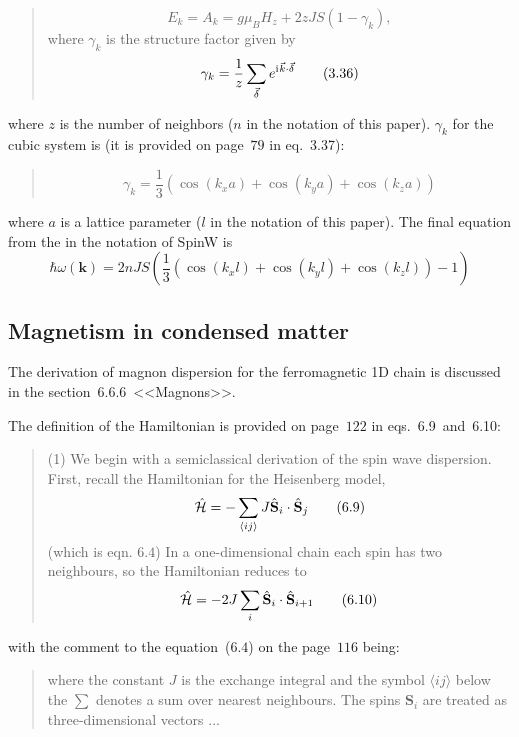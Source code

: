     \begin{quote}
        \begin{equation}
            E_k = A_k = g\mu_B H_z + 2zJS(1 - \gamma_k), \label{eq:fom-3.35} \tag{3.35}
        \end{equation}
        where $\gamma_k$ is the structure factor given by
        \begin{equation}
            \gamma_k = \dfrac{1}{z}\sum_{\vec{\delta}}e^{\mathrm{i}\mkern1mu \vec{k}\cdot\vec{\delta}} \label{eq:fom-3.36} \tag{3.36}
        \end{equation}
    \end{quote}
    where $z$ is the number of neighbors ($n$ in the notation of this paper). $\gamma_k$ for the cubic system is (it is provided on page~$79$ in eq.~3.37):
    \begin{quote}
        \begin{equation}
            \gamma_k = \dfrac{1}{3}(\cos(k_xa) + \cos(k_ya) + \cos(k_za)) \label{eq:fom-3.37} \tag{3.37}
        \end{equation}
    \end{quote}
    where $a$ is a lattice parameter ($l$ in the notation of this paper). The final equation from the \cite{rezende2020fundamentals} in the notation of SpinW is
    \begin{equation}
        \hbar\omega(\mathbf{k}) = 2nJS\left(\dfrac{1}{3}\left(\cos(k_xl) + \cos(k_yl) + \cos(k_zl)\right) - 1\right)
        \label{eq:rezende}
    \end{equation}

\subsection{Magnetism in condensed matter \cite{blundell2003magnetism}}
    The derivation of magnon dispersion for the ferromagnetic 1D chain is discussed in the section~$6.6.6$~<<Magnons>>.

    The definition of the Hamiltonian is provided on page~$122$ in eqs.~6.9~and~6.10:
    \begin{quote}
        (1) We begin with a semiclassical derivation of the spin wave dispersion.
        First, recall the Hamiltonian for the Heisenberg model,
        \begin{equation}
            \hat{\mathcal{H}} = -\sum_{\langle ij\rangle} J\hat{\mathbf{S}}_i \cdot \hat{\mathbf{S}}_j \label{eq:micm-6.9} \tag{6.9}
        \end{equation}
        (which is eqn. $6.4$) In a one-dimensional chain each spin has two neighbours, so the Hamiltonian reduces to
        \begin{equation}
            \hat{\mathcal{H}} = -2J\sum_{i} \hat{\mathbf{S}}_i \cdot \hat{\mathbf{S}}_{i+1} \label{eq:micm-6.10} \tag{6.10}
        \end{equation}
    \end{quote}
    with the comment to the equation~($6.4$) on the page~$116$ being:
    \begin{quote}
        where the constant $J$ is the exchange integral and the symbol $\langle ij \rangle$ below the $\sum$ denotes a sum over nearest neighbours. 
        The spins $\mathbf{S}_i$ are treated as three-dimensional vectors ...
    \end{quote}

